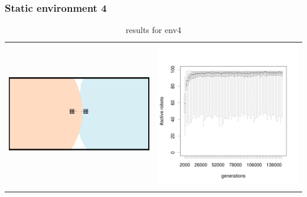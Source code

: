 \documentclass[a4paper,10pt]{article}
\begin{document}
\subsubsection{Static environment 4}

\begin{table}[H]
\caption{results for env4}
\centering
\begin{tabular}{cc}
\includegraphics[width=\imgSize]{../images/5StaticEnv/environments/staticEnv4}&\includegraphics[width=\imgSize]{../images/5StaticEnv/alive_staticEnv4}\\
\newline

\end{tabular}
\end{table}
\end{document}
